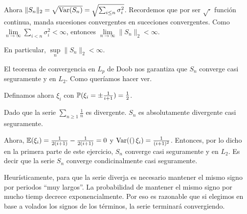 Ahora $\| S_n \|_2 = \sqrt{\text{Var}\! \left( S_n \right)} = \sqrt{\sum_{i \leq n} \sigma_i^2}$. Recordemos que por ser  $\sqrt{\cdot}$
función continua, manda sucesiones convergentes en suceciones convergentes. Como 
$\lim\limits_{n \rightarrow \infty} \sum\limits_{i < n} \sigma_i^2 < \infty$, 
entonces $\lim\limits_{n \rightarrow \infty}\| S_n \|_2 < \infty$.\pn

En particular, $\sup\limits_n \| S_n \|_2 < \infty$.\pn

El teorema de convergencia en $L_p$ de Doob nos garantiza que $S_n$ converge casi seguramente y en $L_2$. Como queríamos
hacer ver.\pn

Definamos ahora $\xi_i$ con $\mathbb{P}(\xi_i = \pm \frac{1}{i+1}) = \frac{1}{2}$.

Dado que la serie $\sum_{n \geq 1} \frac{1}{n}$ es divergente. $S_n$ es absolutamente divergente casi seguramente.\pn

Ahora, $\mathbb{E}(\xi_i) = \frac{1}{2(i+1)}-\frac{1}{2(i+1)} = 0$ y $\text{Var}\! \left( ( \right)\xi_i) = \frac{1}{(i+1)^2}$. Entonces, por lo dicho en la primera
parte de este ejercicio, $S_n$ converge casi seguramente y en $L_2$. Es decir que la serie $S_n$ converge condicinalmente casi seguramente.

Heurísticamente, para que la serie diverja es necesario mantener el mismo signo por periodos ``muy largos''. La probabilidad de mantener el 
mismo signo por mucho tiemp decrece exponencialmente. Por eso es razonable que si elegimos en base a volados los signos de los términos,
la serie terminará convergiendo.